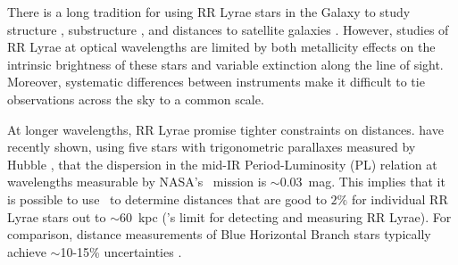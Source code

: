 There is a long tradition for using RR Lyrae stars in the Galaxy to study
structure \citep[e.g.,][]{shapley18}, substructure \citep[e.g.,][]{sesar10}, and
distances to satellite galaxies \citep[e.g.,][]{clementini03}. However, studies
of RR Lyrae at optical wavelengths are limited by both metallicity effects on
the intrinsic brightness of these stars and variable extinction along the line
of sight.  Moreover, systematic differences between instruments make it
difficult to tie observations across the sky to a common scale.

At longer wavelengths, RR Lyrae promise tighter constraints on distances.
\citet{madore12} have recently shown, using five stars with trigonometric
parallaxes measured by Hubble \citep{benedict11}, that the dispersion in the
mid-IR Period-Luminosity (PL) relation \citep[first mapped by][]{longmore86} at
wavelengths measurable by NASA's \spitzer\ mission is $\sim$0.03~mag. This
implies that it is possible to use \spitzer\ to determine distances that are
good to $2\%$ for individual RR Lyrae stars out to $\sim$60~kpc (\spitzer's
limit for detecting and measuring RR Lyrae). For comparison, distance
measurements of Blue Horizontal Branch stars typically achieve $\sim$10-15\%
uncertainties  \citep[if appropriate color measurements are available,
e.g.,][]{deason12b}.

